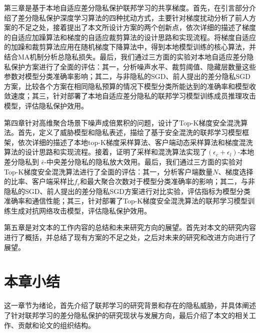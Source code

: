 第三章是基于本地自适应差分隐私保护联邦学习的共享梯度。首先，在引言部分介绍了差分隐私保护深度学习算法的四种扰动方式，主要针对梯度扰动分析了前人方案的不足之处，接着提出了本文所设计方案的两个创新点，依次详细的描述了梯度的自适应加躁算法和梯度的自适应裁剪算法的设计思路和实现流程。将梯度自适应的加躁和裁剪算法应用在随机梯度下降算法中，得到本地模型训练的核心算法，并结合MA机制分析总隐私损失。最后，我们通过三方面的实验对本地自适应差分隐私保护方案进行了全面的评估：其一，分析噪声水平、裁剪阈值、隐藏层数量这些参数对模型分类准确率影响；其二，与非隐私的SGD、前人提出的差分隐私SGD方案，比较各个方案在相同隐私预算的情况下模型分类所能达到的准确率和模型收敛速度；其三，针对部署了本地自适应差分隐私的联邦学习模型训练成员推理攻击模型，评估隐私保护效用。

第四章针对高维聚合场景下噪声成倍累积的问题，设计了Top-K梯度安全混洗算法。首先，定义了威胁模型和隐私表述，描绘了基于安全混洗的联邦学习模型框架，依次详细的描述了本地top-K梯度采样算法、客户端动态采样算法和梯度混洗算法的设计思路和实现流程。接着，证明了采样和混洗算法实现了$\left(\epsilon_{c}+\epsilon_{l}\right)$-本地差分隐私到 $\bar{\epsilon} $-中央差分隐私的隐私放大效用。最后，我们通过三方面的实验对Top-K梯度安全混洗算法进行了全面的评估：其一，分析客户端数量$N$、梯度选择的比率、客户端采样比$f_{r}$和最大聚合次数对于模型分类准确率的影响；其二，与非隐私的SGD、前人提出的差分隐私SGD方案进行对比实验，评估指标为模型分类准确率和通信性能；其三，针对部署了Top-K梯度安全混洗算法的联邦学习模型训练生成对抗网络攻击模型，评估隐私保护效用。

第五章是对文本的工作内容的总结和未来研究方向的展望。首先对本文的研究内容进行了概括，并总结了现有方案的不足之处，之后对未来的研究和改进方向进行了展望。

\section{本章小结}
这一章节为绪论，首先介绍了联邦学习的研究背景和存在的隐私威胁，并具体阐述了针对联邦学习的差分隐私保护的研究现状与发展方向，最后介绍了本文的相关工作、贡献和论文的组织结构。

